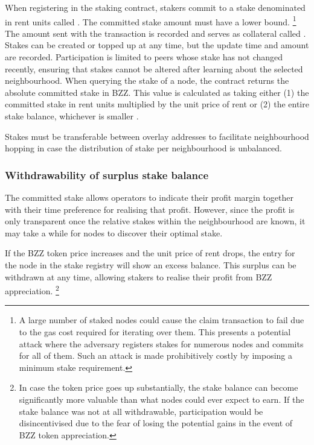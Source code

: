 When registering in the staking contract, stakers commit to a stake denominated in rent units called 
.  The committed stake amount must have a lower bound.%
%
\footnote{A large number of staked nodes could cause the claim transaction to fail due to the gas cost required for iterating over them. This presents a potential attack where the adversary registers stakes for numerous nodes and commits for all of them. Such an attack is made prohibitively costly by imposing a minimum stake requirement.}
%
The  amount sent with the transaction is recorded and serves as collateral called . Stakes can be created or topped up at any time, but the update time and amount are recorded.
Participation is limited to peers whose stake has not changed recently, ensuring that stakes cannot be altered after learning about the selected neighbourhood.
When querying the stake of a node, the contract returns  the  absolute committed stake in BZZ. This value is calculated as taking either (1) the committed stake in rent units multiplied by the unit price of rent  or (2) the entire stake balance, whichever is smaller%
.  

Stakes must be transferable between overlay addresses to facilitate neighbourhood hopping in case the distribution of stake per neighbourhood is unbalanced. 

\subsubsection{Withdrawability of surplus stake balance}



The committed stake allows operators to indicate their profit margin together with their time preference for realising that profit. However, since the profit is only transparent once the relative stakes within the neighbourhood are known, it may take a while for nodes to discover their optimal stake. 

If the BZZ token price increases and the unit price of rent drops, the entry for the node in the stake registry will show an excess balance. This surplus can be withdrawn at any time, allowing stakers to realise their profit from BZZ appreciation.%
%
\footnote{In case the token price goes up substantially, the stake balance can become significantly more valuable than what nodes could ever expect to earn. If the stake balance was not at all withdrawable, participation would be disincentivised due to the fear of losing the potential gains in the event of BZZ token appreciation.}
% 


